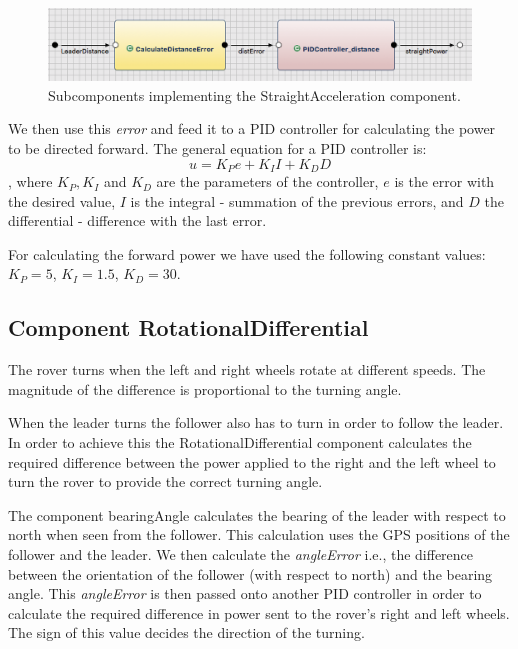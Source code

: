 \begin{figure}[!h]
	\centering
	\includegraphics[width=1\textwidth]{images/straight.png}
	\caption{Subcomponents implementing the StraightAcceleration component.}
	\label{fig:straight}
\end{figure}


We then use this \textit{error} and feed it to a PID controller for calculating
the power to be directed forward. The general equation for a PID controller
is:
\begin{equation}
u = K_Pe + K_II + K_DD
\label{formula:pidController}
\end{equation}
, where $K_P, K_I$ and $K_D$ are the parameters of the controller, $e$ is the error with the desired value, $I$ is the integral - summation of the previous errors, and $D$ the differential - difference with the last error.

For calculating the forward power we have used the following constant values: $K_P = 5$, $K_I=1.5$, $K_D=30$.

\subsection{Component RotationalDifferential}

The rover turns when the left and right wheels rotate at different speeds. The
magnitude of the difference is proportional to the turning angle.

When the leader turns the follower also has to turn in order to follow the
leader. In order to achieve this the \textsf{RotationalDifferential} component
calculates the required difference between the power applied to the right and
the left wheel to turn the rover to provide the correct turning angle.

The component \textsf{bearingAngle} calculates the bearing of the leader with
respect to north when seen from the follower. This calculation uses the GPS
positions of the follower and the leader. We then calculate the
\textit{angleError} i.e., the difference between the orientation of the follower
(with respect to north) and the bearing angle. This
\textit{angleError} is then passed onto another PID controller in order to
calculate the required difference in power sent to the rover's right and left
wheels. The sign of this value decides the direction of the turning.

